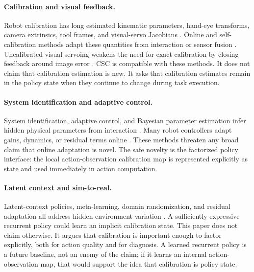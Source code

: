 \documentclass{article}
\begin{document}
\paragraph{Calibration and visual feedback.}
Robot calibration has long estimated kinematic parameters, hand-eye transforms,
camera extrinsics, tool frames, and visual-servo Jacobians
\citep{han2023data,su2003free,yang2022model,seegmiller2014dynamic,
agersand1994differential}. Online and self-calibration methods adapt these
quantities from interaction or sensor fusion
\citep{xu2023novel,martinelli2011state,yang2023cerberus,bohm2021combined,
yang2022kinematic}. Uncalibrated visual servoing weakens the need for exact
calibration by closing feedback around image error
\citep{su2003free,agersand1994differential,leite2023regularized,
papanikolopoulos1993visual,cheah2007vision}. CSC is compatible with these
methods. It does not claim that calibration estimation is new. It asks that
calibration estimates remain in the policy state when they continue to change
during task execution.

\paragraph{System identification and adaptive control.}
System identification, adaptive control, and Bayesian parameter estimation
infer hidden physical parameters from interaction
\citep{bohm2021combined,frigola2013integrated,calandra2017bayesian}. Many
robot controllers adapt gains, dynamics, or residual terms online
\citep{webb2014parameter,anne2021meta,sontakke2023residual}. These methods
threaten any broad claim that online adaptation is novel. The safe novelty is
the factorized policy interface: the local action-observation calibration map
is represented explicitly as state and used immediately in action computation.

\paragraph{Latent context and sim-to-real.}
Latent-context policies, meta-learning, domain randomization, and residual
adaptation all address hidden environment variation
\citep{calandra2017bayesian,anne2021meta,ma2026bridging,howell2022dojo,
leboutet2021inertial}. A sufficiently expressive recurrent policy could learn
an implicit calibration state. This paper does not claim otherwise. It argues
that calibration is important enough to factor explicitly, both for action
quality and for diagnosis. A learned recurrent policy is a future baseline, not
an enemy of the claim; if it learns an internal action-observation map, that
would support the idea that calibration is policy state.
\end{document}
